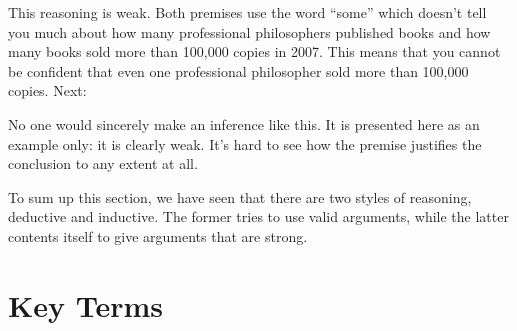 This reasoning is weak. Both premises use the word ``some'' which doesn't tell you much about how many professional philosophers published books and how many books sold more than 100,000 copies in 2007. This means that you cannot be confident that even one professional philosopher sold more than 100,000 copies. Next:

\begin{kormanize}
\end{kormanize}

No one would sincerely make an inference like this. It is presented here as an example only: it is clearly weak. It's hard to see how the premise justifies the conclusion to any extent at all.

To sum up this section, we have seen that there are two styles of reasoning, deductive and inductive. The former tries to use valid arguments, while the latter contents itself to give arguments that are strong.

\section*{Key Terms}
\begin{fullwidth}
\begin{multicols}{2}
\begin{sortedlist}
\end{sortedlist}
\end{multicols}
\end{fullwidth}
